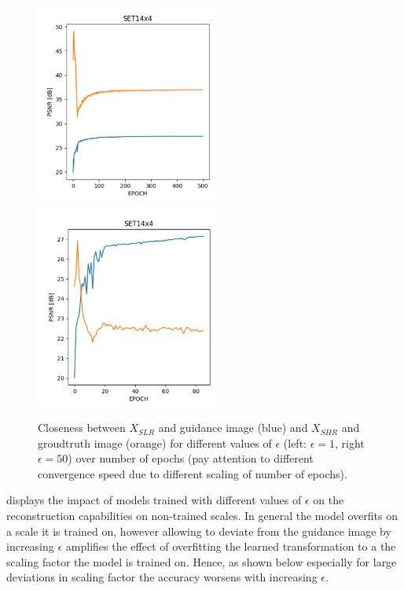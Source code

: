 \begin{figure}[!htbp]
\centering
\includegraphics[width=6cm]{figures/epsball_loss_0_set14}
\includegraphics[width=6cm]{figures/epsball_loss_50_set14}
\caption{Closeness between $X_{SLR}$ and guidance image (blue) and $X_{SHR}$ and groudtruth image (orange) for different values of $\epsilon$ (left: $\epsilon = 1$, right $\epsilon = 50$) over number of epochs (pay attention to different convergence speed due to different scaling of number of epochs).}
\label{fig:epsball_loss}
\end{figure}

 displays the impact of models trained with different values of $\epsilon$ on the reconstruction capabilities on non-trained scales. In general the model overfits on a scale it is trained on, however allowing to deviate from the guidance image by increasing $\epsilon$ amplifies the effect of overfitting the learned transformation to a the scaling factor the model is trained on. Hence, as shown below especially for large deviations in scaling factor the accuracy worsens with increasing $\epsilon$.

